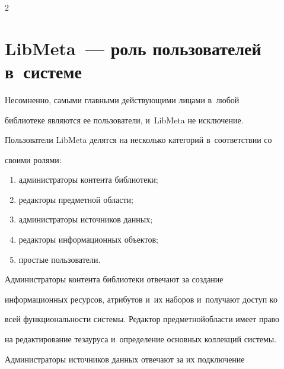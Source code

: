 \begin{multicols}{2}











    

\section{LibMeta~--- роль пользователей в~системе}



    Несомненно, самыми главными действующими лицами в~любой 

библиотеке являются ее пользователи, и~LibMeta не исключение. 

Пользователи LibMeta делятся на несколько категорий в~соответствии со 

своими ролями: 

    \begin{enumerate}[(1)]

\item администраторы контента библиотеки; 

\item редакторы предметной области; 

\item администраторы источников данных; 

\item редакторы информационных объектов; 

\item простые пользователи.

\end{enumerate}









    Администраторы контента библиотеки отвечают за создание 

информационных ресурсов, атрибутов и~их наборов и~получают доступ ко 

всей функциональности системы. Редактор предметной\linebreak об\-ласти имеет право 

на редактирование тезауруса и~определение основных коллекций системы.\linebreak 

Адми\-нистраторы источников данных отвечают за их подключение 


\end{multicols}
